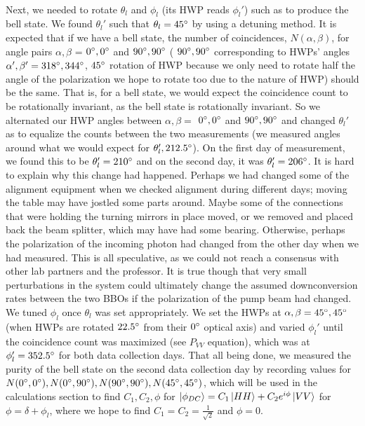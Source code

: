 \documentclass{article}
\begin{document}
    \\\indent Next, we needed to rotate $\theta_l$ and $\phi_l$ (its HWP reads $\phi_l'$) such as to produce the bell state. We found $\theta_l'$ such that $\theta_l = 45\degree$ by using a detuning method. It is expected that if we have a bell state, the number of coincidences, $N(\alpha,\beta)$, for angle pairs $\alpha,\beta$ = $0\degree,0\degree$ and $90\degree,90\degree$ ( $90\degree,90\degree$ corresponding to HWPs' angles $\alpha',\beta'=318\degree,344\degree$, $45\degree$ rotation of HWP because we only need to rotate half the angle of the polarization we hope to rotate too due to the nature of HWP) should be the same. That is, for a bell state, we would expect the coincidence count to be rotationally invariant, as the bell state is rotationally invariant. So we alternated our HWP angles between $\alpha,\beta = $ $0\degree,0\degree$ and $90\degree,90\degree$ and changed $\theta_l'$ as to equalize the counts between the two measurements (we measured angles around what we would expect for $\theta_l', 212.5\degree$). On the first day of measurement, we found this to be $\theta_l' = 210\degree$ and on the second day, it was $\theta_l' = 206\degree$. It is hard to explain why this change had happened. \cite{deh} Perhaps we had changed some of the alignment equipment when we checked alignment during different days; moving the table may have jostled some parts around. Maybe some of the connections that were holding the turning mirrors in place moved, or we removed and placed back the beam splitter, which may have had some bearing. Otherwise, perhaps the polarization of the incoming photon had changed from the other day when we had measured. This is all speculative, as we could not reach a consensus with other lab partners and the professor. It is true though that very small perturbations in the system could ultimately change the assumed downconversion rates between the two BBOs if the polarization of the pump beam had changed.
    \\\indent We tuned $\phi_l$ once $\theta_l$ was set appropriately. We set the HWPs at $\alpha,\beta = 45\degree,45\degree$ (when HWPs are rotated $22.5\degree$ from their $0\degree$ optical axis) and varied $\phi_l'$ until the coincidence count was maximized (see $P_{VV}$ equation), which was at $\phi_l' = 352.5\degree$ for both data collection days. That all being done, we measured the purity of the bell state on the second data collection day by recording values for $N(0\degree,0\degree),N(0\degree,90\degree),N(90\degree,90\degree),N(45\degree,45\degree)$, which will be used in the calculations section to find $C_1, C_2, \phi$ for $\left\vert{\phi_{DC}}\right\rangle = C_1\left\vert{HH}\right\rangle + C_2 e^{i\phi}\left\vert{VV}\right\rangle$ for $\phi = \delta+\phi_l$, where we hope to find $C_1=C_2=\frac{1}{\sqrt{2}}$ and $\phi = 0$. 
\end{document}
